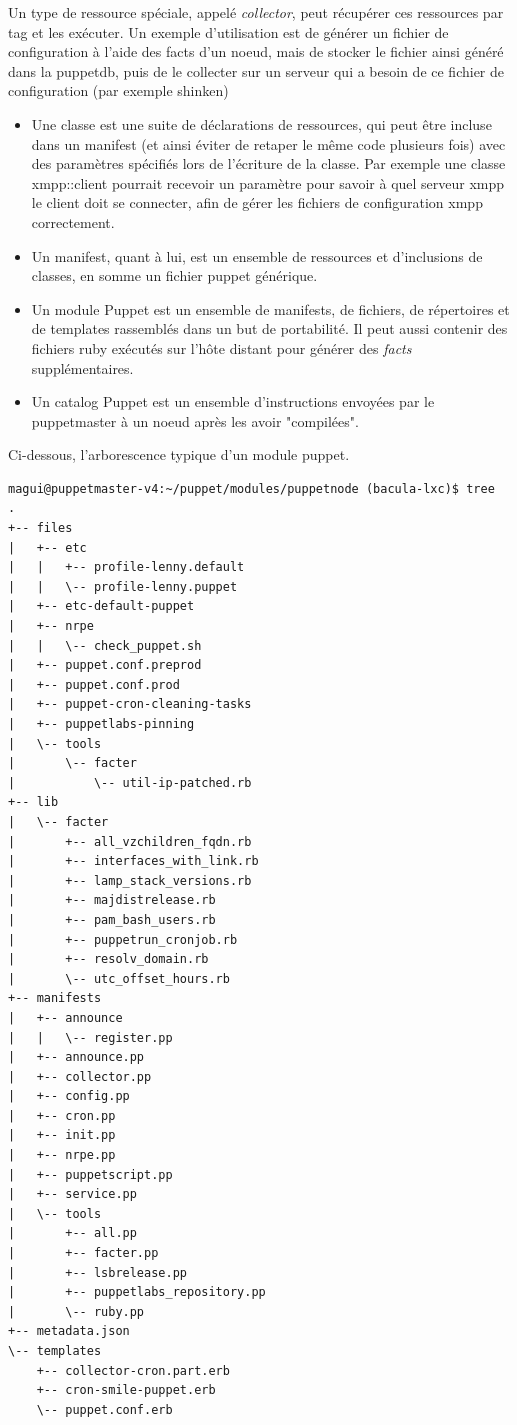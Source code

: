 \documentclass[14 pt]{extreport}
\begin{document}
Un type de ressource spéciale, appelé \emph{collector}, peut récupérer ces ressources par tag et les exécuter. Un exemple d'utilisation est de générer un fichier de configuration à l'aide des facts d'un noeud, mais de stocker le fichier ainsi généré dans la puppetdb, puis de le collecter sur un serveur qui a besoin de ce fichier de configuration (par exemple shinken)

\begin{itemize}
	\item Une classe est une suite de déclarations de ressources, qui peut être incluse dans un manifest (et ainsi éviter de retaper le même code plusieurs fois) avec des paramètres spécifiés lors de l'écriture de la classe. Par exemple une classe xmpp::client pourrait recevoir un paramètre pour savoir à quel serveur xmpp le client doit se connecter, afin de gérer les fichiers de configuration xmpp correctement.
	\item Un manifest, quant à lui, est un ensemble de ressources et d'inclusions de classes, en somme un fichier puppet générique.
	\item Un module Puppet est un ensemble de manifests, de fichiers, de répertoires et de templates rassemblés dans un but de portabilité. Il peut aussi contenir des fichiers ruby exécutés sur l'hôte distant pour générer des \emph{facts} supplémentaires.
	\item Un catalog Puppet est un ensemble d'instructions envoyées par le puppetmaster à un noeud après les avoir "compilées".
\end{itemize}

Ci-dessous, l'arborescence typique d'un module puppet.

\begin{Verbatim}[fontsize=\scriptsize]
magui@puppetmaster-v4:~/puppet/modules/puppetnode (bacula-lxc)$ tree
.
+-- files
|   +-- etc
|   |   +-- profile-lenny.default
|   |   \-- profile-lenny.puppet
|   +-- etc-default-puppet
|   +-- nrpe
|   |   \-- check_puppet.sh
|   +-- puppet.conf.preprod
|   +-- puppet.conf.prod
|   +-- puppet-cron-cleaning-tasks
|   +-- puppetlabs-pinning
|   \-- tools
|       \-- facter
|           \-- util-ip-patched.rb
+-- lib
|   \-- facter
|       +-- all_vzchildren_fqdn.rb
|       +-- interfaces_with_link.rb
|       +-- lamp_stack_versions.rb
|       +-- majdistrelease.rb
|       +-- pam_bash_users.rb
|       +-- puppetrun_cronjob.rb
|       +-- resolv_domain.rb
|       \-- utc_offset_hours.rb
+-- manifests
|   +-- announce
|   |   \-- register.pp
|   +-- announce.pp
|   +-- collector.pp
|   +-- config.pp
|   +-- cron.pp
|   +-- init.pp
|   +-- nrpe.pp
|   +-- puppetscript.pp
|   +-- service.pp
|   \-- tools
|       +-- all.pp
|       +-- facter.pp
|       +-- lsbrelease.pp
|       +-- puppetlabs_repository.pp
|       \-- ruby.pp
+-- metadata.json
\-- templates
    +-- collector-cron.part.erb
    +-- cron-smile-puppet.erb
    \-- puppet.conf.erb

\end{Verbatim}
\end{document}
